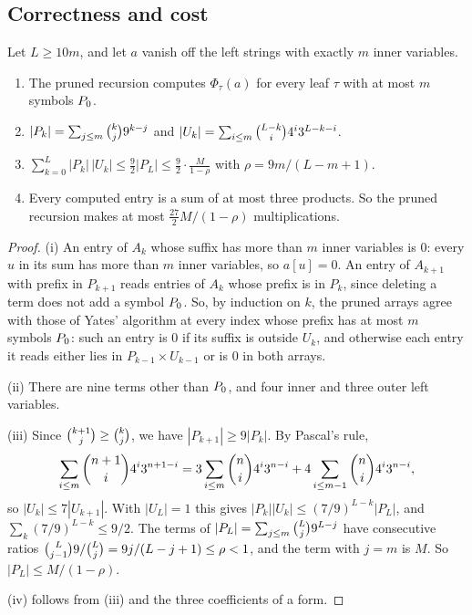\subsection{Correctness and cost}

\begin{theorem}\label{thm:pruned}
Let \(L\ge10m\), and let \(a\) vanish off the left strings with exactly \(m\)
inner variables.
\begin{enumerate}
\item The pruned recursion computes \(\Phi_\tau(a)\) for every leaf \(\tau\)
  with at most \(m\) symbols \(P_{0}\).
\item \(|P_k|=\sum_{j\le m}\binom{k}{j}9^{k-j}\) and
  \(|U_k|=\sum_{i\le m}\binom{L-k}{i}4^{i}3^{L-k-i}\).
\item \(\sum_{k=0}^{L}|P_k|\,|U_k|\le\frac92|P_L|\le\frac92\cdot\frac{M}{1-\rho}\)
  with \(\rho=9m/(L-m+1)\).
\item Every computed entry is a sum of at most three products.  So the pruned
  recursion makes at most \(\frac{27}{2}M/(1-\rho)\) multiplications.
\end{enumerate}
\end{theorem}

\begin{proof}
(i) An entry of \(A_k\) whose suffix has more than \(m\) inner variables is
\(0\): every \(u\) in its sum has more than \(m\) inner variables, so
\(a[u]=0\).  An entry of \(A_{k+1}\) with prefix in \(P_{k+1}\) reads entries of
\(A_k\) whose prefix is in \(P_k\), since deleting a term does not add a
symbol \(P_{0}\).  So, by induction on \(k\), the pruned arrays agree with those
of Yates' algorithm at every index whose prefix has at most \(m\) symbols
\(P_{0}\): such an entry is \(0\) if its suffix is outside \(U_k\), and otherwise
each entry it reads either lies in \(P_{k-1}\times U_{k-1}\) or is \(0\) in both
arrays.

(ii) There are nine terms other than \(P_{0}\), and four inner and three outer
left variables.

(iii) Since \(\binom{k+1}{j}\ge\binom{k}{j}\), we have
\(|P_{k+1}|\ge9|P_k|\).  By Pascal's rule,
\[
  \sum_{i\le m}\binom{n+1}{i}4^{i}3^{n+1-i}
  =3\sum_{i\le m}\binom{n}{i}4^{i}3^{n-i}
   +4\sum_{i\le m-1}\binom{n}{i}4^{i}3^{n-i},
\]
so \(|U_k|\le7|U_{k+1}|\).  With \(|U_L|=1\) this gives
\(|P_k||U_k|\le(7/9)^{L-k}|P_L|\), and \(\sum_{k}(7/9)^{L-k}\le9/2\).  The terms
of \(|P_L|=\sum_{j\le m}\binom{L}{j}9^{L-j}\) have consecutive ratios
\(\binom{L}{j-1}9/\binom{L}{j}=9j/(L-j+1)\le\rho<1\), and the term with
\(j=m\) is \(M\).  So \(|P_L|\le M/(1-\rho)\).

(iv) follows from (iii) and the three coefficients of a form.
\end{proof}

